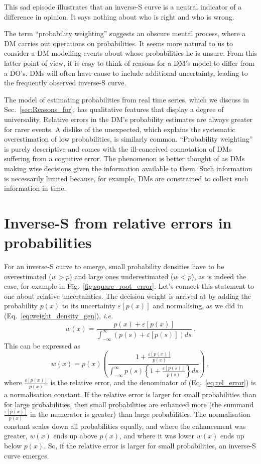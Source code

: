 \documentclass[a4paper, 12pt]{article}
\newcommand{\elabel}[1]{\label{eq:#1}}
\newcommand{\eref}[1]{(Eq.~\ref{eq:#1})}
\newcommand{\fref}[1]{Fig.~\ref{fig:#1}}
\newcommand{\seclabel}[1]{\label{sec:#1}}
\newcommand{\secref}[1]{Sec.~\ref{sec:#1}}
\newcommand{\ie}{\textit{i.e.}\xspace}
\newcommand{\be}{\begin{equation}}
\newcommand{\ee}{\end{equation}}
\newcommand{\err}[1]{\varepsilon\left[#1\right]}
\begin{document}
This sad episode illustrates that an inverse-S curve is a neutral indicator of a difference in opinion. It says nothing about who is right and who is wrong.

The term ``probability weighting'' suggests an obscure mental process, where a DM carries out operations on probabilities. It seems more natural to us to consider a DM modelling events about whose probabilities he is unsure. From this latter point of view, it is easy to think of reasons for a DM's model to differ from a DO's. DMs will often have cause to include additional uncertainty, leading to the frequently observed inverse-S curve.

The model of estimating probabilities from real time series, which we discuss in \secref{Reasons_for}, has qualitative features that display a degree of universality. Relative errors in the DM's probability estimates are always greater for rarer events. A dislike of the unexpected, which explains the systematic overestimation of low probabilities, is similarly common. ``Probability weighting'' is purely descriptive and comes with the ill-conceived connotation of DMs suffering from a cognitive error. The phenomenon is better thought of as DMs making wise decisions given the information available to them. Such information is necessarily limited because, for example, DMs are constrained to collect such information in time.

\newpage
\printbibliography

\appendix

\newpage
\section{Inverse-S from relative errors in probabilities}
\seclabel{relative_errors}

For an inverse-S curve to emerge, small probability densities have to be overestimated ($w>p$) and large ones underestimated ($w<p$), as is indeed the case, for example in \fref{square_root_error}. Let's connect this statement to one about relative uncertainties. The decision weight is arrived at by adding the probability $p(x)$ to its uncertainty $\err{p(x)}$ and normalising, as we did in \eref{weight_density_gen}, \ie
\be
w(x)=\frac{p(x)+\err{p(x)}}{\int_{-\infty}^{\infty} \left( p(s)+\err{p(s)} \right) ds}~.
\ee
This can be expressed as
\be
w(x)=p(x) \left(\frac{1+\frac{\err{p(x)}}{p(x)}}{\int_{-\infty}^{\infty} p(s)\left\{1+\frac{\err{p(s)}}{p(s)}\right\} ds}\right)~,
\elabel{rel_error}
\ee
where $\frac{\err{p(x)}}{p(x)}$ is the relative error, and the denominator of  \eref{rel_error} is a normalisation constant. If the relative error is larger for small probabilities than for large probabilities, then small probabilities are enhanced more (the summand $\frac{\err{p(x)}}{p(x)}$ in the numerator is greater) than large probabilities. The normalisation constant scales down all probabilities equally, and where the enhancement was greater, $w(x)$ ends up above $p(x)$, and where it was lower $w(x)$ ends up below $p(x)$. So, if the relative error is larger for small probabilities, an inverse-S curve emerges.
\end{document}
